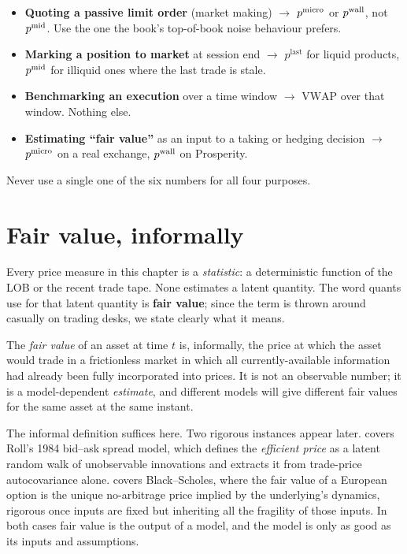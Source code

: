 \begin{keyfactbox}
\begin{itemize}
  \item \textbf{Quoting a passive limit order} (market making) $\to$
  $p^{\mathrm{micro}}$ or $p^{\mathrm{wall}}$, not $p^{\mathrm{mid}}$. Use the one the book's
  top-of-book noise behaviour prefers.
  \item \textbf{Marking a position to market} at session end $\to$
  $p^{\mathrm{last}}$ for liquid products, $p^{\mathrm{mid}}$ for illiquid
  ones where the last trade is stale.
  \item \textbf{Benchmarking an execution} over a time window $\to$
  $\mathrm{VWAP}$ over that window. Nothing else.
  \item \textbf{Estimating ``fair value''} as an input to a taking or
  hedging decision $\to$ $p^{\mathrm{micro}}$ on a real exchange,
  $p^{\mathrm{wall}}$ on Prosperity.
\end{itemize}
Never use a single one of the six numbers for all four purposes.
\end{keyfactbox}

\section{Fair value, informally}
\label{sec:fair_value}

Every price measure in this chapter is a \emph{statistic}: a
deterministic function of the LOB or the recent trade tape. None
estimates a latent quantity. The word quants use for that latent
quantity is \textbf{fair value}; since the term is thrown around
casually on trading desks, we state clearly what it means.

\begin{definition}
The \emph{fair value} of an asset at time $t$ is, informally, the
price at which the asset would trade in a frictionless market in
which all currently-available information had already been fully
incorporated into prices. It is not an observable number; it is a
model-dependent \emph{estimate}, and different models will give
different fair values for the same asset at the same instant.
\end{definition}

The informal definition suffices here. Two rigorous instances appear
later.  covers Roll's 1984 bid--ask spread
model, which defines the \emph{efficient price} as a latent random
walk of unobservable innovations and extracts it from trade-price
autocovariance alone.  covers Black--Scholes,
where the fair value of a European option is the unique
no-arbitrage price implied by the underlying's dynamics, rigorous
once inputs are fixed but inheriting all the fragility of those
inputs. In both cases fair value is the output of a model, and the
model is only as good as its inputs and assumptions.

